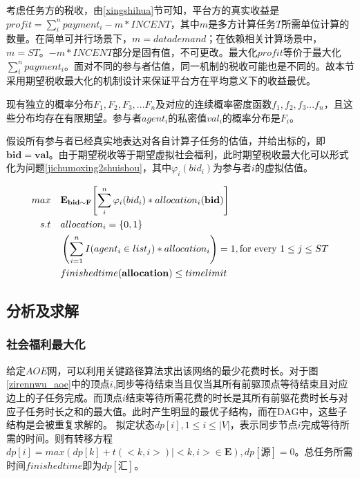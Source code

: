 \documentclass[promaster]{thesis-uestc}
\begin{document}
考虑任务方的税收，由\ref{xingshihua}节可知，平台方的真实收益是$profit = \sum_{i}^{n}{payment_i}-m*INCENT$，其中$m$是多方计算任务$T$所需单位计算的数量。在简单可并行场景下，$m=datademand$；在依赖相关计算场景中，$m=ST$。$-m*INCENT$部分是固有值，不可更改。最大化$profit$等价于最大化$\sum_{i}^{n}{payment_i}$。面对不同的参与者估值，同一机制的税收可能也是不同的。故本节采用期望税收最大化的机制设计来保证平台方在平均意义下的收益最优。

现有独立的概率分布$F_1,F_2,F_3,...F_n$及对应的连续概率密度函数$f_1,f_2,f_3...f_n$，且这些分布均存在有限期望。参与者$agent_i$的私密值$val_i$的概率分布是$F_i$。

假设所有参与者已经真实地表达对各自计算子任务的估值，并给出标的，即$\mathbf{bid}=\mathbf{val}$。由于期望税收等于期望虚拟社会福利，此时期望税收最大化可以形式化为问题\ref{jichumoxing2shuishou}，其中$\varphi _i(bid_i)$为参与者$i$的虚拟估值。

\begin{align}
    \label{jichumoxing2shuishou} 
    max\quad&\mathbf{E}_{\mathbf{bid}\sim\mathbf{F}}{\left[\sum_{i}^{n}{\varphi _i(bid_i)*allocation_i(\mathbf{bid})}\right]}\\
    s.t                     \quad&allocation_i = \{0,1\}\notag\\
    \quad&\left(\sum_{i=1}^{n}{I(agent_i \in list_j)*allocation_i}\right) = 1,\text{for every }1 \leq j \leq ST\notag\\
    \quad&finishedtime(\mathbf{allocation}) \leq timelimit
    \notag
\end{align}

\FloatBarrier

\subsection{分析及求解}

\subsubsection{社会福利最大化}

给定$AOE$网，可以利用关键路径算法求出该网络的最少花费时长。对于图\ref{zirennwu_aoe}中的顶点$i$,同步等待结束当且仅当其所有前驱顶点等待结束且对应边上的子任务完成。而顶点$i$结束等待所需花费的时长是其所有前驱花费时长与对应子任务时长之和的最大值。此时产生明显的最优子结构，而在DAG中，这些子结构是会被重复求解的。
拟定状态$dp[i],1 \leq i\leq |V|$，表示同步节点$i$完成等待所需的时间。则有转移方程$dp[i] = max(dp[k]+t(<k,i>)|<k,i> \in \mathbf{E}),dp[\text{源}] = 0$。总任务所需时间$finishedtime$即为$dp[\text{汇}]$。
\end{document}

